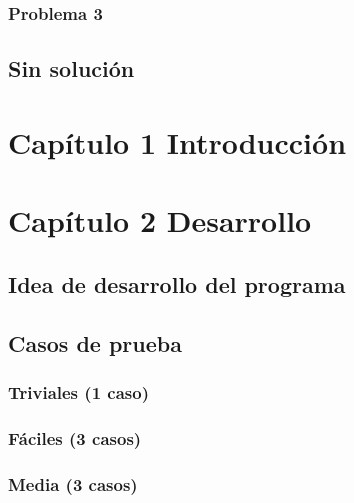 \documentclass[
  spanish,
]{article}
\begin{document}
\hypertarget{problema-3-2}{%
\subsubsection{Problema 3}\label{problema-3-2}}

\hypertarget{sin-soluciuxf3n}{%
\subsection{Sin solución}\label{sin-soluciuxf3n}}

\hypertarget{capuxedtulo-1-introducciuxf3n-1}{%
\section{Capítulo 1
Introducción}\label{capuxedtulo-1-introducciuxf3n-1}}

\hypertarget{capuxedtulo-2-desarrollo}{%
\section{Capítulo 2 Desarrollo}\label{capuxedtulo-2-desarrollo}}

\hypertarget{idea-de-desarrollo-del-programa}{%
\subsection{Idea de desarrollo del
programa}\label{idea-de-desarrollo-del-programa}}

\hypertarget{casos-de-prueba}{%
\subsection{Casos de prueba}\label{casos-de-prueba}}

\hypertarget{triviales-1-caso}{%
\subsubsection{Triviales (1 caso)}\label{triviales-1-caso}}

\hypertarget{fuxe1ciles-3-casos}{%
\subsubsection{Fáciles (3 casos)}\label{fuxe1ciles-3-casos}}

\hypertarget{media-3-casos}{%
\subsubsection{Media (3 casos)}\label{media-3-casos}}
\end{document}
